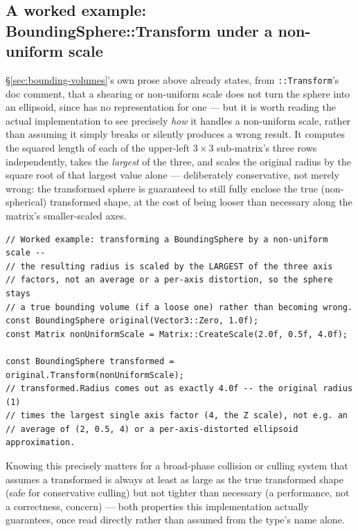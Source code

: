 \subsection{A worked example: BoundingSphere::Transform under a non-uniform scale}

\S\ref{sec:bounding-volumes}'s own prose above already states, from
\texttt{::Transform}'s doc comment, that a shearing or non-uniform
scale does not turn the sphere into an ellipsoid, since  has no
representation for one --- but it is worth reading the actual implementation to see precisely
\emph{how} it handles a non-uniform scale, rather than assuming it simply breaks or silently
produces a wrong result. It computes the squared length of each of the upper-left
$3\times3$ sub-matrix's three rows independently, takes the \emph{largest} of the three, and
scales the original radius by the square root of that largest value alone --- deliberately
conservative, not merely wrong: the transformed sphere is guaranteed to still fully enclose
the true (non-spherical) transformed shape, at the cost of being looser than necessary along
the matrix's smaller-scaled axes.

\begin{lstlisting}
// Worked example: transforming a BoundingSphere by a non-uniform scale --
// the resulting radius is scaled by the LARGEST of the three axis
// factors, not an average or a per-axis distortion, so the sphere stays
// a true bounding volume (if a loose one) rather than becoming wrong.
const BoundingSphere original(Vector3::Zero, 1.0f);
const Matrix nonUniformScale = Matrix::CreateScale(2.0f, 0.5f, 4.0f);

const BoundingSphere transformed = original.Transform(nonUniformScale);
// transformed.Radius comes out as exactly 4.0f -- the original radius (1)
// times the largest single axis factor (4, the Z scale), not e.g. an
// average of (2, 0.5, 4) or a per-axis-distorted ellipsoid approximation.
\end{lstlisting}

Knowing this precisely matters for a broad-phase collision or culling system that assumes a
transformed  is always at least as large as the true transformed
shape (safe for conservative culling) but not tighter than necessary (a performance, not a
correctness, concern) --- both properties this implementation actually guarantees, once read
directly rather than assumed from the type's name alone.

